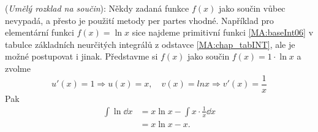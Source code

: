 \begin{mdframed}[style=mdexam]
  \begin{example}\label{MAI:exam109}
    (\emph{Umělý rozklad na součin}): Někdy zadaná funkce \(f(x)\) jako součin vůbec nevypadá, a
    přesto je použití metody per partes vhodné. Například pro elementární funkci \(f(x) = \ln x\)
    sice najdeme primitivní funkci \ref{MA:baseInt06} v tabulce základních neurčitých integrálů z
    odstavce \ref{MA:chap_tabINT}, ale je možné postupovat i jinak. Představme si \(f(x)\) jako
    součin \(f(x) = 1\cdot\ln x\) a zvolme \[u'(x) = 1 ⇒ u(x) = x, \quad v(x) = lnx ⇒ v'(x) =
    \frac{1}{x}\] Pak 
    \begin{align*}
      \int\ln\dd{x} &= x\ln x - \int x\cdot\frac{1}{x}\dd{x}  \\ 
                    &= x\ln x - x.
    \end{align*}
  \end{example}
\end{mdframed}